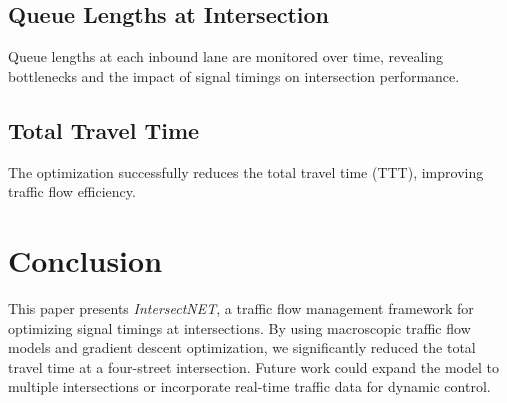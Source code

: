 \documentclass[conference]{IEEEtran}
\begin{document}
\subsection{Queue Lengths at Intersection}
Queue lengths at each inbound lane are monitored over time, revealing bottlenecks and the impact of signal timings on intersection performance.

\subsection{Total Travel Time}
The optimization successfully reduces the total travel time (TTT), improving traffic flow efficiency.

\section{Conclusion}
This paper presents \textit{IntersectNET}, a traffic flow management framework for optimizing signal timings at intersections. By using macroscopic traffic flow models and gradient descent optimization, we significantly reduced the total travel time at a four-street intersection. Future work could expand the model to multiple intersections or incorporate real-time traffic data for dynamic control.

\balance
\end{document}
